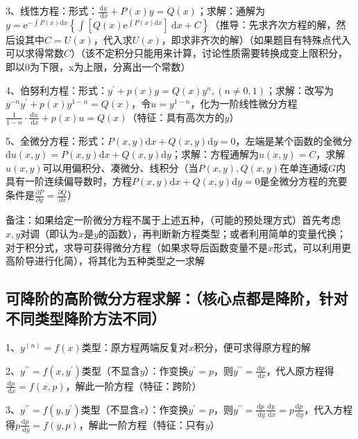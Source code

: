 3、线性方程：形式：$\frac{\mathrm{d} y}{\mathrm{~d} x}+P(x) y=Q(x)$；求解：通解为$y=\mathrm{e}^{-\int P(x) \mathrm{d} x}\left\{\int \left[Q(x) \mathrm{e}^{\int P(x) \mathrm{d} x} \right]\mathrm{~d} x+C\right\}$（推导：先求齐次方程的解，然后设其中$C=U(x)$，代入求$U(x)$，即求非齐次的解）（如果题目有特殊点代入可以求得常数$C$）（该不定积分只能用来计算，讨论性质需要转换成变上限积分，即以0为下限，x为上限，分离出一个常数）

4、伯努利方程：形式：$y^{\prime}+p(x) y=Q(x) y^{n},(n \neq 0,1)$；求解：改写为$y^{-n} y^{\prime}+p(x) y^{1-n}=Q(x)$，令$u=y^{1-n}$，化为一阶线性微分方程$\frac{1}{1-n} \cdot \frac{\mathrm{d} u}{\mathrm{~d} x}+p(x) u=Q(x)$（特征：具有高次方的$y$）

5、全微分方程：形式：$P(x, y) \mathrm{d} x+Q(x, y) \mathrm{d} y=0$，左端是某个函数的全微分$\mathrm{d} u(x, y)=P(x, y) \mathrm{d} x+Q(x, y) \mathrm{d} y$；求解：方程通解为$u(x, y)=C$，求解$u(x, y)$可以用偏积分、凑微分、线积分（当$P(x, y), Q(x, y)$在单连通域$G$内具有一阶连续偏导数时，方程$P(x, y) \mathrm{d} x+Q(x, y) \mathrm{d} y=0$是全微分方程的充要条件是$\frac{\partial P}{\partial y}=\frac{\partial Q}{\partial x}$）

备注：如果给定一阶微分方程不属于上述五种，（可能的预处理方式）首先考虑$x,y$对调（即认为$x$是$y$的函数），再判断新方程类型；或者利用简单的变量代换；对于积分式，求导可获得微分方程（如果求导后函数变量不是$x$形式，可以利用更高阶导进行化简），将其化为五种类型之一求解



\subsection{可降阶的高阶微分方程求解：（核心点都是降阶，针对不同类型降阶方法不同）}

1、${y}^{(n)}={f}({x})$类型：原方程两端反复对$x$积分，便可求得原方程的解

2、${y}^{\prime \prime}={f}\left({x}, {y}^{\prime}\right)$类型（不显含${y}$）：作变换$y^{\prime}=p$，则$y^{\prime \prime}=\frac{\mathrm{d} p}{\mathrm{~d} x}$，代人原方程得$\frac{\mathrm{d} p}{\mathrm{~d} x}=f(x, p)$，解此一阶方程（特征：跨阶）

3、${y}^{\prime \prime}={f}\left({y}, {y}^{\prime}\right)$类型（不显含$x$）：作变换$y^{\prime}=p$，则$y^{\prime \prime}=\frac{\mathrm{d} p}{\mathrm{~d} y} \frac{\mathrm{d} y}{\mathrm{~d} x}=p \frac{\mathrm{d} p}{\mathrm{~d} y}$，代入方程得$p \frac{\mathrm{d} p}{\mathrm{~d} y}=f(y, p)$，解此一阶方程（特征：只有$y$）



